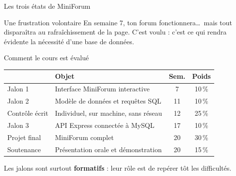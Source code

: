 \documentclass[aspectratio=169,11pt]{beamer}
\newcommand{\hdr}[1]{\multicolumn{1}{l}{\color{white}\bfseries #1}}
\newcommand{\hdrc}[1]{\multicolumn{1}{c}{\color{white}\bfseries #1}}
\begin{document}
\begin{frame}{Les trois états de MiniForum}
  \begin{center}
  \end{center}
  \vspace{0.3cm}
  \begin{alertblock}{Une frustration volontaire}
    En semaine 7, ton forum fonctionnera\ldots\ mais tout disparaîtra au rafraîchissement de la page. C'est voulu : c'est ce qui rendra évidente la nécessité d'une base de données.
  \end{alertblock}
\end{frame}

\begin{frame}{Comment le cours est évalué}
  \begin{center}
  \small
  \begin{tabularx}{0.95\textwidth}{lXcc}
    \toprule
    \rowcolor{accentBlue}
  \hdr{Épreuve} &  \hdr{Objet} &  \hdrc{Sem.} &  \hdrc{Poids} \\
    \midrule
    \rowcolor{cfptGrey}
    Jalon 1 & Interface MiniForum interactive & 7 & 10\,\% \\
    Jalon 2 & Modèle de données et requêtes SQL & 11 & 10\,\% \\
    \rowcolor{cfptGrey}
    Contrôle écrit & Individuel, sur machine, sans réseau & 12 & 25\,\% \\
    Jalon 3 & API Express connectée à MySQL & 17 & 10\,\% \\
    \rowcolor{cfptGrey}
    Projet final & MiniForum complet & 20 & 30\,\% \\
    Soutenance & Présentation orale et démonstration & 20 & 15\,\% \\
    \bottomrule
  \end{tabularx}
  \end{center}
  \vspace{0.2cm}
  \begin{center}
    \small Les jalons sont surtout \textbf{formatifs} : leur rôle est de repérer tôt les difficultés.
  \end{center}
\end{frame}
\end{document}
